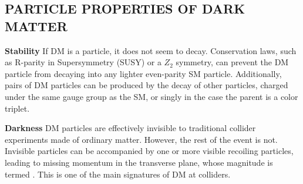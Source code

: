 \begin{textbox}[!h]
\section{PARTICLE PROPERTIES OF DARK MATTER}

\textbf{Stability}
If DM is a particle, it does not seem to decay.
Conservation laws, such as R-parity in Supersymmetry (SUSY) or a $Z_2$ symmetry, can prevent the DM particle from decaying into any lighter even-parity SM particle.
Additionally, pairs of DM particles can be produced by the decay of other particles, charged under the same gauge group as the SM, or singly in the case the parent is a color triplet. 

\textbf{Darkness} 
DM particles are effectively invisible to traditional collider experiments made of ordinary matter. However, the rest of the event is not. 
Invisible particles can be accompanied by one or more visible recoiling particles, leading to missing momentum in the transverse plane, whose magnitude is termed \MET. This is one of the main signatures of DM at colliders.

\end{textbox}
